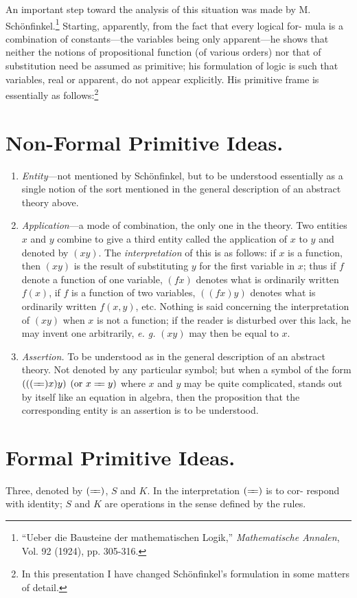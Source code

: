 \documentclass[10pt, twoside]{extarticle}
\newcommand\litem[1]{\item{\textit{#1}}}
\def\varequals#1{\mathrel{\leaders\hbox to3pt{$=$\hss}\hskip#1=}}
\newcommand\longeq{\varequals{0.4em}}
\theoremstyle{breaktheorem}
\theoremstyle{mylemma}
\theoremstyle{mydefinition}
\theoremstyle{mycorollary}
\begin{document}
An important step toward the analysis of this situation was made by
M. Schönfinkel.\footnote{``Ueber die Bausteine der mathematischen Logik,'' \textit{Mathematische Annalen}, Vol. 92 (1924), pp. 305-316.} Starting, apparently, from the fact that every logical for-
mula is a combination of constants---the variables being only apparent---he
shows that neither the notions of propositional function (of various orders)
nor that of substitution need be assumed as primitive; his formulation of
logic is such that variables, real or apparent, do not appear explicitly. His primitive frame is essentially as follows:\footnote{In this presentation I have changed Schönfinkel's formulation in some matters of detail.}

\section{Non-Formal Primitive Ideas.}
\begin{enumerate}[label=\arabic*.,font=\itshape,wide]
\litem{Entity}---not mentioned by Schönfinkel, but to be understood
essentially as a single notion of the sort mentioned in the general description
of an abstract theory above.

\litem{Application}---a mode of combination, the only one in the theory.
Two entities \(x\) and \(y\) combine to give a third entity called the application of
\(x\) to \(y\) and denoted by \((xy)\). The \textit{interpretation} of this is as follows: if \(x\) is a function,
then \((xy)\) is the result of substituting \(y\) for the first variable in \(x\);
thus if \(f\) denote a function of one variable, \((fx)\) denotes what is ordinarily
written \(f(x)\), if \(f\) is a function of two variables, \(((fx) y)\) denotes what is
ordinarily written \(f(x, y)\), etc. Nothing is said concerning the interpretation
of \((xy)\) when \(x\) is not a function; if the reader is disturbed over this lack,
he may invent one arbitrarily, \textit{e. g.} \((xy)\) may then be equal to \(x\).

\litem{Assertion.} To be understood as in the general description of an
abstract theory. Not denoted by any particular symbol; but when a symbol
of the form \((((\longeq)x)y)\) \((\text{or } x \longeq y)\) where \(x\) and \(y\) may be quite complicated,
stands out by itself like an equation in algebra, then the proposition that the
corresponding entity is an assertion is to be understood.
\end{enumerate}

\section{Formal Primitive Ideas.}
\indent Three, denoted by \((\longeq)\), \(S\) and \(K\). In the interpretation \((\longeq)\) is to cor-
respond with identity; \(S\) and \(K\) are operations in the sense defined by the
rules.
\end{document}
